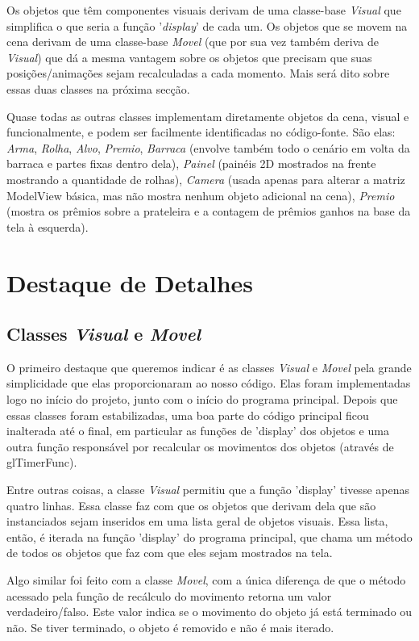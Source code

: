\documentclass[a4paper,10pt]{article}
\begin{document}
Os objetos que têm componentes visuais derivam de uma classe-base \emph{Visual} que simplifica o que seria a função '\emph{display}' de cada um. Os objetos que se movem na cena derivam de uma classe-base \emph{Movel} (que por sua vez também deriva de \emph{Visual}) que dá a mesma vantagem sobre os objetos que precisam que suas posições/animações sejam recalculadas a cada momento. Mais será dito sobre essas duas classes na próxima secção.

Quase todas as outras classes implementam diretamente objetos da cena, visual e funcionalmente, e podem ser facilmente identificadas no código-fonte. São elas: \emph{Arma}, \emph{Rolha}, \emph{Alvo}, \emph{Premio}, \emph{Barraca} (envolve também todo o cenário em volta da barraca e partes fixas dentro dela), \emph{Painel} (painéis 2D mostrados na frente mostrando a quantidade de rolhas), \emph{Camera} (usada apenas para alterar a matriz ModelView básica, mas não mostra nenhum objeto adicional na cena), \emph{Premio} (mostra os prêmios sobre a prateleira e a contagem de prêmios ganhos na base da tela à esquerda).


\section{Destaque de Detalhes}

\subsection{Classes \emph{Visual} e \emph{Movel}}
O primeiro destaque que queremos indicar é as classes \emph{Visual} e \emph{Movel} pela grande simplicidade que elas proporcionaram ao nosso código. Elas foram implementadas logo no início do projeto, junto com o início do programa principal. Depois que essas classes foram estabilizadas, uma boa parte do código principal ficou inalterada até o final, em particular as funções de 'display' dos objetos e uma outra função responsável por recalcular os movimentos dos objetos (através de glTimerFunc).

Entre outras coisas, a classe \emph{Visual} permitiu que a função 'display' tivesse apenas quatro linhas. Essa classe faz com que os objetos que derivam dela que são instanciados sejam inseridos em uma lista geral de objetos visuais. Essa lista, então, é iterada na função 'display' do programa principal, que chama um método de todos os objetos que faz com que eles sejam mostrados na tela.

Algo similar foi feito com a classe \emph{Movel}, com a única diferença de que o método acessado pela função de recálculo do movimento retorna um valor verdadeiro/falso. Este valor indica se o movimento do objeto já está terminado ou não. Se tiver terminado, o objeto é removido e não é mais iterado.
\end{document}
